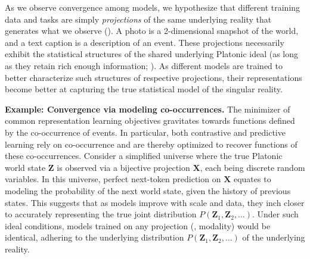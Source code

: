 



As we observe convergence among models, we hypothesize that different training data and tasks are simply \emph{projections} of the same underlying reality that generates what we observe (). A photo is a 2-dimensional snapshot of the world, and a text caption is a description of an event. These projections necessarily exhibit the statistical structures of the shared underlying Platonic ideal (as long as they retain rich enough information; \citet{shannon1948mathematical}). 
As different models are trained to better characterize such structures of respective projections, their representations become better at capturing the true statistical model of the singular reality.

\vspace{5.5pt}\textbf{Example: Convergence via modeling co-occurrences.} 
The minimizer of common representation learning objectives gravitates towards functions defined by the co-occurrence of events. 
% 
In particular, both contrastive and predictive learning rely on co-occurrence and are thereby optimized to recover functions of these co-occurrences. Consider a simplified universe where the true Platonic world state $\mathbf{Z}$ is observed via a bijective projection $\mathbf{X}$, each being discrete random variables. 
In this universe, perfect next-token prediction on $\mathbf{X}$ equates to modeling the probability of the next world state, given the history of previous states. This suggests that as models improve with scale and data, they inch closer to accurately representing the true joint distribution $P(\mathbf{Z}_1, \mathbf{Z}_2, \dots)$. Under such ideal conditions, models trained on any projection (\eg, modality) would be identical, adhering to the underlying distribution $P(\mathbf{Z}_1, \mathbf{Z}_2, \dots)$ of the underlying reality. 


